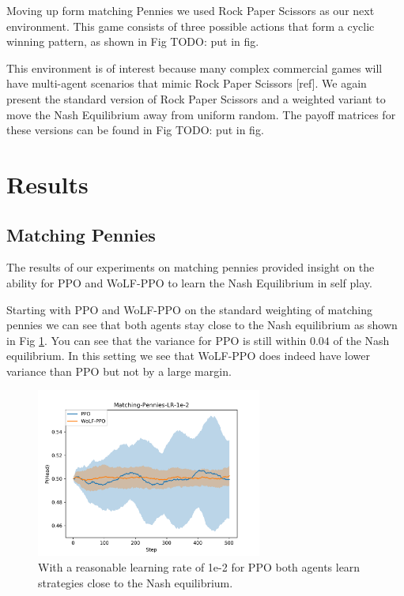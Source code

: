 \documentclass[conference]{IEEEtran}
\newcommand\TODO[1]{{\color{red}TODO: #1}}
\begin{document}
Moving up form matching Pennies we used Rock Paper Scissors as our next environment. This game consists of three possible actions that form a cyclic winning pattern, as shown in Fig \TODO{put in fig}.

This environment is of interest because many complex commercial games will have multi-agent scenarios that mimic Rock Paper Scissors [ref]. We again present the standard version of Rock Paper Scissors and a weighted variant to move the Nash Equilibrium away from uniform random. The payoff matrices for these versions can be found in Fig \TODO{put in fig}.

\section{Results}

\subsection{Matching Pennies}

The results of our experiments on matching pennies provided insight on the ability for PPO and WoLF-PPO to learn the Nash Equilibrium in self play.

Starting with PPO and WoLF-PPO on the standard weighting of matching pennies we can see that both agents stay close to the Nash equilibrium as shown in Fig \ref{fig:mp-ppo-e2}. You can see that the variance for PPO is still within $0.04$ of the Nash equilibrium. In this setting we see that WoLF-PPO does indeed have lower variance than PPO but not by a large margin.

\begin{figure}
    \centering
    \includegraphics[width=20em]{Figures/matching-pennies-lr-1e-2.png}
    \caption{With a reasonable learning rate of 1e-2 for PPO both agents learn strategies close to the Nash equilibrium.}
    \label{fig:mp-ppo-e2}
\end{figure}
\end{document}
